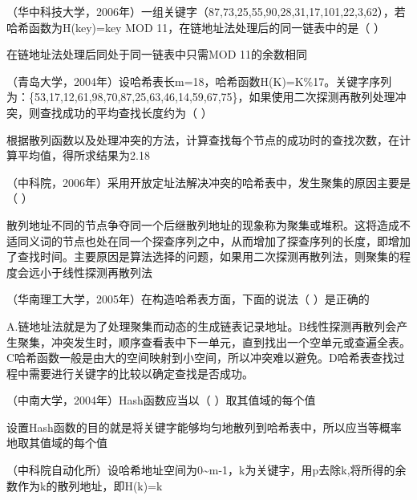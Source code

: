 \question （华中科技大学，2006年）一组关键字（87,73,25,55,90,28,31,17,101,22,3,62），若哈希函数为H(key)=key
MOD 11，在链地址法处理后的同一链表中的是（ ）
\par{}
\begin{solution}在链地址法处理后同处于同一链表中只需MOD 11的余数相同
\end{solution}
\question （青岛大学，2004年）设哈希表长m=18，哈希函数H(K)=K\%17。关键字序列为：\{53,17,12,61,98,70,87,25,63,46,14,59,67,75\}，如果使用二次探测再散列处理冲突，则查找成功的平均查找长度约为（
）
\par{}
\begin{solution}根据散列函数以及处理冲突的方法，计算查找每个节点的成功时的查找次数，在计算平均值，得所求结果为2.18
\end{solution}
\question （中科院，2006年）采用开放定址法解决冲突的哈希表中，发生聚集的原因主要是（
）
\par{}
\begin{solution}散列地址不同的节点争夺同一个后继散列地址的现象称为聚集或堆积。这将造成不适同义词的节点也处在同一个探查序列之中，从而增加了探查序列的长度，即增加了查找时间。主要原因是算法选择的问题，如果用二次探测再散列法，则聚集的程度会远小于线性探测再散列法
\end{solution}
\question （华南理工大学，2005年）在构造哈希表方面，下面的说法（ ）是正确的
\par{}
\begin{solution}A.链地址法就是为了处理聚集而动态的生成链表记录地址。B线性探测再散列会产生聚集，冲突发生时，顺序查看表中下一单元，直到找出一个空单元或查遍全表。C哈希函数一般是由大的空间映射到小空间，所以冲突难以避免。D哈希表查找过程中需要进行关键字的比较以确定查找是否成功。
\end{solution}
\question （中南大学，2004年）Hash函数应当以（ ）取其值域的每个值
\par{}
\begin{solution}设置Hash函数的目的就是将关键字能够均匀地散列到哈希表中，所以应当等概率地取其值域的每个值
\end{solution}
\question （中科院自动化所）设哈希地址空间为0\textasciitilde{}m-1，k为关键字，用p去除k,将所得的余数作为k的散列地址，即H(k)=k
